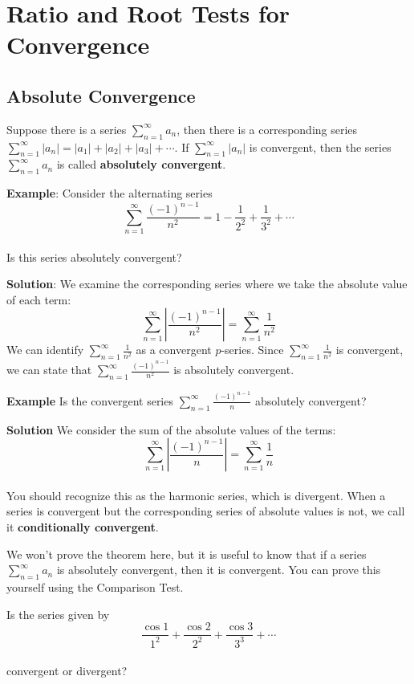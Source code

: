 \section{Ratio and Root Tests for Convergence}
\subsection{Absolute Convergence}
Suppose there is a series $\sum_{n=1}^\infty a_n$, then there is a 
corresponding series $\sum_{n=1}^\infty |a_n| = |a_1| + |a_2| + |a_3| + 
\cdots$. If $\sum_{n=1}^\infty |a_n|$ is convergent, then the series $\sum_
{n=1}^\infty a_n$ is called \textbf{absolutely convergent}. 

\textbf{Example}: Consider the alternating series 
$$\sum_{n=1}^\infty \frac{(-1)^{n-1}}{n^2} = 1 - \frac{1}{2^2} + 
\frac{1}{3^2} + \cdots$$\\
Is this series absolutely convergent?

\textbf{Solution}: We examine the corresponding series where we take the 
absolute value of each term:
$$\sum_{n=1}^\infty \left|\frac{(-1)^{n-1}}{n^2} \right| = \sum_{n=1}^
\infty \frac{1}{n^2}$$
We can identify $\sum_{n=1}^\infty \frac{1}{n^2}$ as a convergent $p$-series. 
Since $\sum_{n=1}^\infty \frac{1}{n^2}$ is convergent, we can state that 
$\sum_{n=1}^\infty \frac{(-1)^{n-1}}{n^2}$ is absolutely convergent. 

\textbf{Example} Is the convergent series $\sum_{n=1}^\infty 
\frac{(-1)^{n-1}}{n}$ absolutely convergent?

\textbf{Solution} We consider the sum of the absolute values of the terms:
$$\sum_{n=1}^\infty \left|\frac{(-1)^{n-1}}{n}\right| = \sum_{n=1}^\infty 
\frac{1}{n}$$\\
You should recognize this as the harmonic series, which is divergent. When a 
series is convergent but the corresponding series of absolute values is not, 
we call it \textbf{conditionally convergent}. 

We won't prove the theorem here, but it is useful to know that if a series 
$\sum_{n=1}^\infty a_n$ is absolutely convergent, then it is convergent. You 
can prove this yourself using the Comparison Test. 

\begin{Exercise}[label = absconv1]
Is the series given by 
$$\frac{\cos{1}}{1^2} + \frac{\cos{2}}{2^2} + \frac{\cos{3}}{3^3} + \cdots$$ \\
convergent or divergent?
\vspace{40mm}
\end{Exercise}

